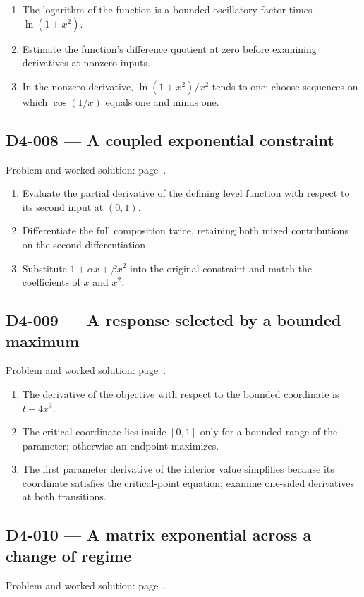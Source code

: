 \documentclass[11pt,oneside,openany]{book}
\begin{document}
\begin{enumerate}
\item The logarithm of the function is a bounded oscillatory factor times \(\ln(1+x^2)\).
\item Estimate the function's difference quotient at zero before examining derivatives at nonzero inputs.
\item In the nonzero derivative, \(\ln(1+x^2)/x^2\) tends to one; choose sequences on which \(\cos(1/x)\) equals one and minus one.
\end{enumerate}
\subsection*{D4-008 --- A coupled exponential constraint}
\label{hints:D4-008}
Problem and worked solution: page~\pageref{problem:D4-008}.

\begin{enumerate}
\item Evaluate the partial derivative of the defining level function with respect to its second input at \((0,1)\).
\item Differentiate the full composition twice, retaining both mixed contributions on the second differentiation.
\item Substitute \(1+\alpha x+\beta x^2\) into the original constraint and match the coefficients of \(x\) and \(x^2\).
\end{enumerate}
\subsection*{D4-009 --- A response selected by a bounded maximum}
\label{hints:D4-009}
Problem and worked solution: page~\pageref{problem:D4-009}.

\begin{enumerate}
\item The derivative of the objective with respect to the bounded coordinate is \(t-4x^3\).
\item The critical coordinate lies inside \([0,1]\) only for a bounded range of the parameter; otherwise an endpoint maximizes.
\item The first parameter derivative of the interior value simplifies because its coordinate satisfies the critical-point equation; examine one-sided derivatives at both transitions.
\end{enumerate}
\subsection*{D4-010 --- A matrix exponential across a change of regime}
\label{hints:D4-010}
Problem and worked solution: page~\pageref{problem:D4-010}.
\end{document}

